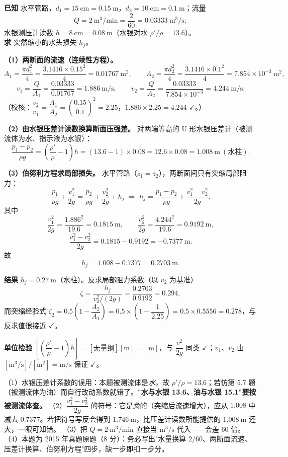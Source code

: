 \begin{jie}
\textbf{已知} 水平管路，$d_1=15\ \mathrm{cm}=0.15\ \mathrm{m}$，$d_2=10\ \mathrm{cm}=0.1\ \mathrm{m}$；流量
\[Q=2\ \mathrm{m^3/min}=\frac{2}{60}=0.03333\ \mathrm{m^3/s};\]
水银测压计读数 $h=8\ \mathrm{cm}=0.08\ \mathrm{m}$（水银对水 $\rho'/\rho=13.6$）。\\
\textbf{求} 突然缩小的水头损失 $h_j$。

\textbf{（1）两断面的流速（连续性方程）。}
\[A_1=\frac{\pi d_1^2}{4}=\frac{3.1416\times0.15^2}{4}=0.01767\ \mathrm{m^2},\qquad
A_2=\frac{\pi d_2^2}{4}=\frac{3.1416\times0.1^2}{4}=7.854\times10^{-3}\ \mathrm{m^2},\]
\[v_1=\frac{Q}{A_1}=\frac{0.03333}{0.01767}=1.886\ \mathrm{m/s},\qquad
v_2=\frac{Q}{A_2}=\frac{0.03333}{7.854\times10^{-3}}=4.244\ \mathrm{m/s}.\]
（校核：$\dfrac{v_2}{v_1}=\dfrac{A_1}{A_2}=\left(\dfrac{0.15}{0.1}\right)^2=2.25$，$1.886\times2.25=4.244$ $\checkmark$。）

\textbf{（2）由水银压差计读数换算断面压强差。} 对两端等高的 U 形水银压差计（被测流体为水、指示液为水银）：
\[\frac{p_1-p_2}{\rho g}=\left(\frac{\rho'}{\rho}-1\right)h=(13.6-1)\times0.08=12.6\times0.08=1.008\ \mathrm{m}\ (\text{水柱}).\]

\textbf{（3）伯努利方程求局部损失。} 水平管路（$z_1=z_2$），两断面间只有突缩局部阻力：
\[\frac{p_1}{\rho g}+\frac{v_1^2}{2g}=\frac{p_2}{\rho g}+\frac{v_2^2}{2g}+h_j
\;\Longrightarrow\;h_j=\frac{p_1-p_2}{\rho g}+\frac{v_1^2-v_2^2}{2g}.\]
其中
\[\frac{v_1^2}{2g}=\frac{1.886^2}{19.6}=0.1815\ \mathrm{m},\qquad
\frac{v_2^2}{2g}=\frac{4.244^2}{19.6}=0.9192\ \mathrm{m},\]
\[\frac{v_1^2-v_2^2}{2g}=0.1815-0.9192=-0.7377\ \mathrm{m}.\]
故
\[h_j=1.008-0.7377=0.2703\ \mathrm{m}.\]

\textbf{结果} $\boxed{h_j=0.27\ \mathrm{m}}$（水柱）。反求局部阻力系数（以 $v_2$ 为基准）
\[\zeta=\frac{h_j}{v_2^2/(2g)}=\frac{0.2703}{0.9192}=0.294,\]
而突缩经验式 $\zeta_2=0.5\left(1-\dfrac{A_2}{A_1}\right)=0.5\times\left(1-\dfrac{1}{2.25}\right)=0.5\times0.5556=0.278$，与反求值很接近 $\checkmark$。

\textbf{单位检验} $\left[\left(\dfrac{\rho'}{\rho}-1\right)h\right]=[\text{无量纲}][\mathrm{m}]=[\mathrm{m}]$，与 $\dfrac{v^2}{2g}$ 同类 $\checkmark$；$v_1$、$v_2$ 由 $[\mathrm{m^3/s}]/[\mathrm{m^2}]=\mathrm{m/s}$ 保证 $\checkmark$。
\end{jie}
\begin{yicuo}
（1）水银压差计系数的误用：本题被测流体是\emph{水}，故 $\rho'/\rho=13.6$；若仿第 5.7 题（被测流体为油）而自行改动系数就错了。\textbf{"水与水银 13.6、油与水银 15.1"要按被测流体查。}
（2）$\dfrac{v_1^2-v_2^2}{2g}$ 的符号：它是\emph{负}的（突缩后流速增大），应从 $1.008$ 中减去 $0.7377$。若把符号写反会得到 $1.746\ \mathrm{m}$，比压差计读数所能提供的 $1.008\ \mathrm{m}$ 还大，一眼可知错。
（3）把 $Q=2\ \mathrm{m^3/min}$ 直接当 $\mathrm{m^3/s}$ 代入——会差 60 倍。
（4）本题为 2015 年真题原题（8 分）：务必写出"水量换算 $2/60$、两断面流速、压差计换算、伯努利方程"四步，缺一步即扣一步分。
\end{yicuo}
